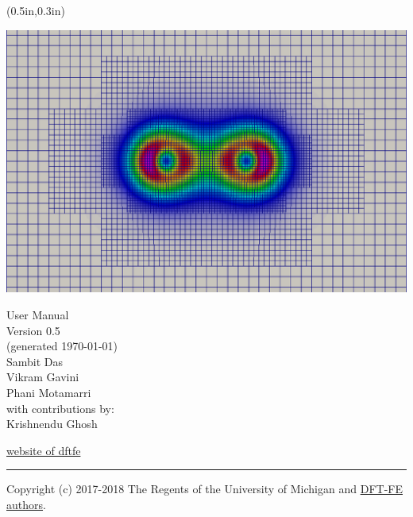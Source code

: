 \documentclass{article}
\begin{document}
{%
\begin{textblock*}{0in}(0.5in,0.3in)
\begin{center}
\vspace{1em}
\includegraphics[scale=0.35]{N2.png}
\hspace{5em}
\end{center}
\end{textblock*}

\color{dark_grey}
\vspace{1.0em}
\hfill{\Huge \fontfamily{\sfdefault}\selectfont User Manual \\
\raggedleft \huge \fontfamily{\sfdefault}\selectfont Version
0.5 %
\\\large(generated \today)\\
\vspace{1.5em}
{\Large Sambit Das\,\\Vikram Gavini\,\\Phani Motamarri\\}
\vspace{1.0em}
\large
\noindent with contributions by: \\
    {\Large Krishnendu Ghosh\\}
\vspace{1.0em}
}
\null
\vspace{17em}

{\noindent
{\fontfamily{\sfdefault}\selectfont \href{https://sites.google.com/umich.edu/dftfe}{website of dftfe}}
}


{\noindent
\color{dark_grey}
\rule{\textwidth}{2pt}
}

}
Copyright (c) 2017-2018 The Regents of the University of Michigan and \hyperref[sec:authors]{DFT-FE authors}.
\pagebreak
{}
\end{document}
